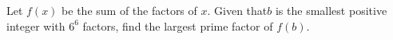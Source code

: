 Let $f(x)$ be the sum of the factors of $x$. Given that$ b$ is the smallest positive integer with $6^6$ factors, find the largest prime factor of $f(b)$.
